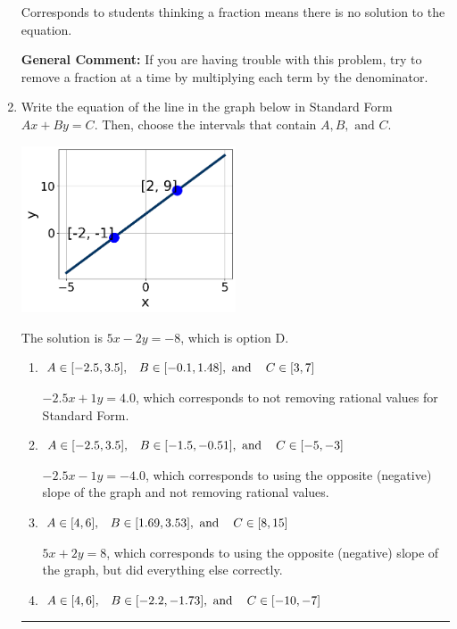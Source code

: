 \documentclass{extbook}[14pt]
\newcommand{\litem}[1]{\item #1

\rule{\textwidth}{0.4pt}}
\begin{document}
\begin{enumerate}
{\begin{enumerate}[label=\Alph*.]
Corresponds to students thinking a fraction means there is no solution to the equation.
\end{enumerate}

\textbf{General Comment:} If you are having trouble with this problem, try to remove a fraction at a time by multiplying each term by the denominator.
}
\litem{
Write the equation of the line in the graph below in Standard Form $Ax+By=C$. Then, choose the intervals that contain $A, B, \text{ and } C$.

\begin{center}
    \includegraphics[width=0.5\textwidth]{../Figures/linearGraphToStandardC.png}
\end{center}


The solution is \( 5x - 2y = -8 \), which is option D.\begin{enumerate}[label=\Alph*.]
\item \( A \in [-2.5, 3.5], \hspace{3mm} B \in [-0.1, 1.48], \text{ and } \hspace{3mm} C \in [3, 7] \)

 $-2.5x + 1y = 4.0$, which corresponds to not removing rational values for Standard Form.
\item \( A \in [-2.5, 3.5], \hspace{3mm} B \in [-1.5, -0.51], \text{ and } \hspace{3mm} C \in [-5, -3] \)

 $-2.5x - 1y = -4.0$, which corresponds to using the opposite (negative) slope of the graph and not removing rational values.
\item \( A \in [4, 6], \hspace{3mm} B \in [1.69, 3.53], \text{ and } \hspace{3mm} C \in [8, 15] \)

 $5x + 2y = 8$, which corresponds to using the opposite (negative) slope of the graph, but did everything else correctly.
\item \( A \in [4, 6], \hspace{3mm} B \in [-2.2, -1.73], \text{ and } \hspace{3mm} C \in [-10, -7] \)


\end{enumerate}}
\end{enumerate}
\end{document}
